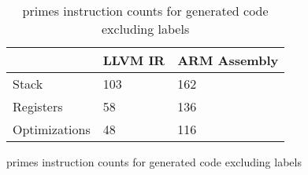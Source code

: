 \begin{table}[h!]
\centering
\begin{tabular}{p{}p{}p{}}
  \hline
 & LLVM IR & ARM Assembly \\ 
  \hline
Stack & 103 & 162 \\ 
  Registers &  58 & 136 \\ 
  Optimizations &  48 & 116 \\ 
   \hline
\end{tabular}
\caption{primes instruction counts for generated code excluding labels}
\caption{primes instruction counts for generated code excluding labels}
\end{table}
